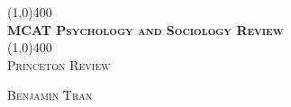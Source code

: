 \documentclass[10pt,a4paper]{report}
\makeatletter
\let\org@subfile
\renewcommand*{}[1]{%
  \filename@parse{#1}%
  \expandafter
  \graphicspath\expandafter{\expandafter{\filename@area/images/}}%
  \org@subfile{#1}%
}
\makeatother
\begin{document}
\begin{titlepage}
	\begin{center}
		\line(1,0){400}\\
		[0.25in]
		\huge{\bfseries \textsc{MCAT Psychology and Sociology Review}}\\
		[0.10in]
		\line(1,0){400}\\
		\textsc{Princeton Review}\\
		[10cm]
	\end{center}
	
	\begin{flushright}
		\textsc{Benjamin Tran}
	\end{flushright}
\end{titlepage}
	
	\tableofcontents
	\thispagestyle{empty}
	\cleardoublepage
	
	\setcounter{page}{1}
	
	~ %

	
	
	
	
\end{document}
